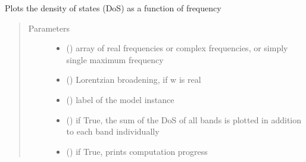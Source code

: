\documentclass[letterpaper,10pt,english]{sphinxmanual}
\begin{document}
\begin{fulllineitems}
\label{\detokenize{spectral:pyqcm.spectral.DoS}}
\sphinxAtStartPar
Plots the density of states (DoS) as a function of frequency
\begin{quote}\begin{description}
\item[{Parameters}] \leavevmode\begin{itemize}
\item {} 
\sphinxAtStartPar
{} () \textendash{} array of real frequencies or complex frequencies, or simply single maximum frequency

\item {} 
\sphinxAtStartPar
{} () \textendash{} Lorentzian broadening, if w is real

\item {} 
\sphinxAtStartPar
{} () \textendash{} label of the model instance

\item {} 
\sphinxAtStartPar
{} () \textendash{} if True, the sum of the DoS of all bands is plotted in addition to each band individually

\item {} 
\sphinxAtStartPar
{} () \textendash{} if True, prints computation progress


\end{itemize}
\end{description}
\end{quote}
\end{fulllineitems}
\end{document}
